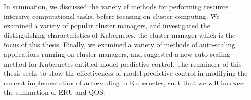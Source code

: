 In summation, we discussed the variety of methods for performing resource intensive
computational tasks, before focusing on cluster computing. We examined a variety
of popular cluster managers, and investigated the distinguishing characteristics
of Kubernetes, the cluster manager which is the focus of this thesis. Finally, we examined
a variety of methods of auto-scaling applications running on cluster managers,
and suggested a new auto-scaling method for Kubernetes entitled
model predictive control. The remainder of this thesis
seeks to show the effectiveness of model predictive control in modifying the
current implementation of auto-scaling in Kubernetes, such that we will increase
the summation of ERU and QOS.
